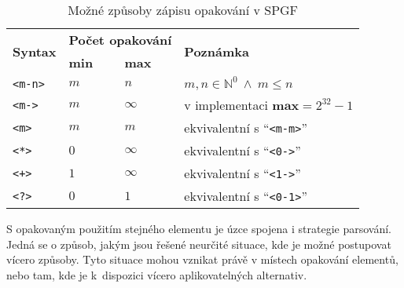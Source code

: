 \begin{table}[ht!]
	\centering
	\def\width{14mm}
	\begin{tabular}{|l|p{\width}|p{\width}|l|}
		\hline
		\multirow{2}{*}{\textbf{Syntax}} & \multicolumn{2}{c|}{\textbf{Počet opakování}} & \multirow{2}{*}{\textbf{Poznámka}}                                               \\
		\cline{2-3}
		                                 & \textbf{min}                                  & \textbf{max}                       &                                             \\
		\hline
		\texttt{<m-n>}                   & $m$                                           & $n$                                & $m,n \in \mathbb{N}^{0} \ \wedge \ m\leq n$ \\
		\hline
		\texttt{<m->}                    & $m$                                           & $\infty$                           & v implementaci $\textbf{max} = 2^{32}-1$    \\
		\hline
		\texttt{<m>}                     & $m$                                           & $m$                                & ekvivalentní s \enquote{\texttt{<m-m>}}     \\
		\hline
		\texttt{<*>}                     & $0$                                           & $\infty$                           & ekvivalentní s \enquote{\texttt{<0->}}      \\
		\hline
		\texttt{<+>}                     & $1$                                           & $\infty$                           & ekvivalentní s \enquote{\texttt{<1->}}      \\
		\hline
		\texttt{<?>}                     & $0$                                           & $1$                                & ekvivalentní s \enquote{\texttt{<0-1>}}     \\
		\hline
	\end{tabular}
	\caption{Možné způsoby zápisu opakování v SPGF}\label{tab:repeat_syntax}
\end{table}

S opakovaným použitím stejného elementu je úzce spojena i strategie parsování.
Jedná se o způsob, jakým jsou řešené neurčité situace, kde je možné postupovat vícero způsoby.
Tyto situace mohou vznikat právě v místech opakování elementů, nebo tam, kde je k~dispozici vícero aplikovatelných alternativ.

